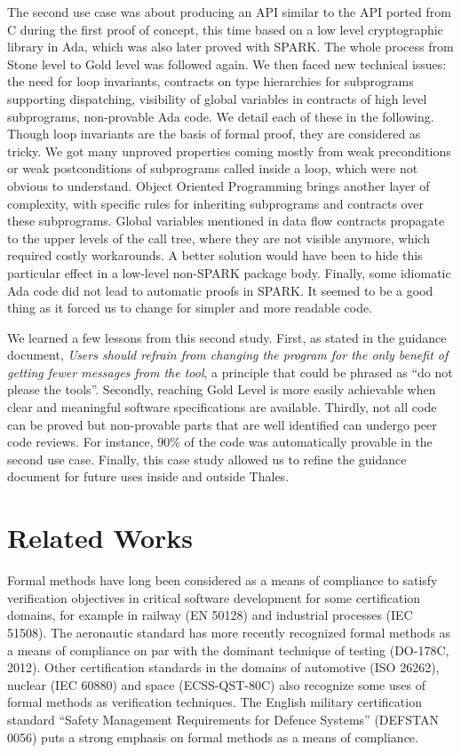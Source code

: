 \documentclass{llncs}
\begin{document}
The second use case was about producing an API similar to the API ported from C
during the first proof of concept, this time based on a low level cryptographic
library in Ada, which was also later proved with SPARK. The whole process from
Stone level to Gold level was followed again. We then faced new technical
issues: the need for loop invariants, contracts on type hierarchies for
subprograms supporting dispatching, visibility of global variables in contracts
of high level subprograms, non-provable Ada code. We detail each of these in
the following. Though loop invariants are the basis of formal proof, they are
considered as tricky. We got many unproved properties coming mostly from weak
preconditions or weak postconditions of subprograms called inside a loop, which
were not obvious to understand. Object Oriented Programming brings another
layer of complexity, with specific rules for inheriting subprograms and
contracts over these subprograms. Global variables mentioned in data flow
contracts propagate to the upper levels of the call tree, where they are not
visible anymore, which required costly workarounds. A better solution would
have been to hide this particular effect in a low-level non-SPARK package
body. Finally, some idiomatic Ada code did not lead to automatic proofs in
SPARK. It seemed to be a good thing as it forced us to change for simpler and
more readable code.

We learned a few lessons from this second study. First, as stated in the
guidance document, \textit{Users should refrain from changing the program for
  the only benefit of getting fewer messages from the tool}, a principle that
could be phrased as ``do not please the tools''. Secondly, reaching Gold Level
is more easily achievable when clear and meaningful software specifications are
available. Thirdly, not all code can be proved but non-provable parts that are
well identified can undergo peer code reviews. For instance, 90\% of the code
was automatically provable in the second use case. Finally, this case study
allowed us to refine the guidance document for future uses inside and outside
Thales.

\section{Related Works}

Formal methods have long been considered as a means of compliance to satisfy
verification objectives in critical software development for some certification
domains, for example in railway (EN 50128) and industrial processes (IEC
51508). The aeronautic standard has more recently recognized formal methods as
a means of compliance on par with the dominant technique of testing (DO-178C,
2012). Other certification standards in the domains of automotive (ISO 26262),
nuclear (IEC 60880) and space (ECSS-QST-80C) also recognize some uses of formal
methods as verification techniques. The English military certification standard
``Safety Management Requirements for Defence Systems'' (DEFSTAN 0056) puts a
strong emphasis on formal methods as a means of compliance.
\end{document}
